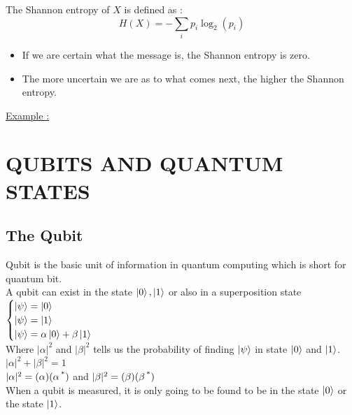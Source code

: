 \documentclass[12pt,oneside]{book}
\begin{document}
The Shannon entropy of $X$ is defined as :
\[H(X) = - \sum_ip_i\log_2(p_i)\]
\begin{itemize}
    \item If we are certain what the message is, the Shannon entropy is zero.
    \item The more uncertain we are as to what comes next, the higher the Shannon entropy.
\end{itemize}
\underline{Example :}
\chapter{QUBITS AND QUANTUM STATES}
\section{The Qubit}
Qubit is the basic unit of information in quantum computing which is short for quantum bit.\\
A qubit can exist in the state $\ket{0},\ket{1}$ or also in a superposition state$\begin{cases}
        \ket{\psi} = \ket{0} \\
        \ket{\psi} = \ket{1} \\
        \ket{\psi} = \alpha\ket{0} + \beta\ket{1}
    \end{cases}$\\
Where $|\alpha|^2$ and $|\beta|^2$ tells us the probability of finding $\ket{\psi}$ in state $\ket{0}$ and $\ket{1}$.\\
$|\alpha|^2 + |\beta|^2 = 1$\\
$|\alpha|^2 = (\alpha)(\alpha\operatorname{^*})$ and $|\beta|^2 = (\beta)(\beta\operatorname{^*})$\\
When a qubit is measured, it is only going to be found to be in the state $\ket{0}$ or the state $\ket{1}$.\\
\end{document}
